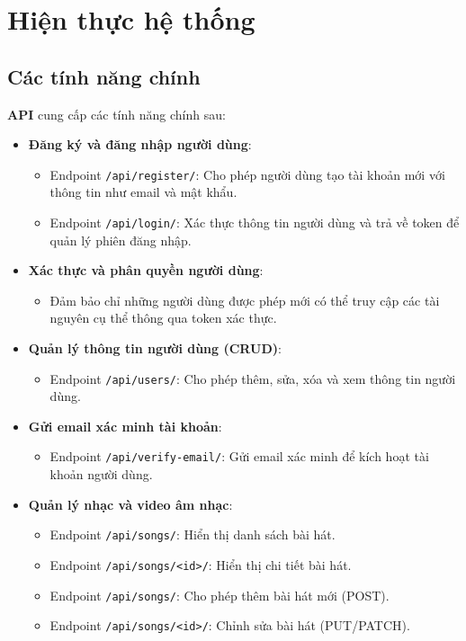 \chapter{Hiện thực hệ thống}
\section{Các tính năng chính}
\textbf{API} cung cấp các tính năng chính sau:
\begin{itemize}
    \item \textbf{Đăng ký và đăng nhập người dùng}: 
    \begin{itemize}
        \item Endpoint \texttt{/api/register/}: Cho phép người dùng tạo tài khoản mới với thông tin như email và mật khẩu.
        \item Endpoint \texttt{/api/login/}: Xác thực thông tin người dùng và trả về token để quản lý phiên đăng nhập.
    \end{itemize}
    \item \textbf{Xác thực và phân quyền người dùng}: 
    \begin{itemize}
        \item Đảm bảo chỉ những người dùng được phép mới có thể truy cập các tài nguyên cụ thể thông qua token xác thực.
    \end{itemize}
    \item \textbf{Quản lý thông tin người dùng (CRUD)}: 
    \begin{itemize}
        \item Endpoint \texttt{/api/users/}: Cho phép thêm, sửa, xóa và xem thông tin người dùng.
    \end{itemize}
    \item \textbf{Gửi email xác minh tài khoản}: 
    \begin{itemize}
        \item Endpoint \texttt{/api/verify-email/}: Gửi email xác minh để kích hoạt tài khoản người dùng.
    \end{itemize}
    \item \textbf{Quản lý nhạc và video âm nhạc}:
    \begin{itemize}
        \item Endpoint \texttt{/api/songs/}: Hiển thị danh sách bài hát.
        \item Endpoint \texttt{/api/songs/<id>/}: Hiển thị chi tiết bài hát.
        \item Endpoint \texttt{/api/songs/}: Cho phép thêm bài hát mới (POST).
        \item Endpoint \texttt{/api/songs/<id>/}: Chỉnh sửa bài hát (PUT/PATCH).

\end{itemize}
\end{itemize}
